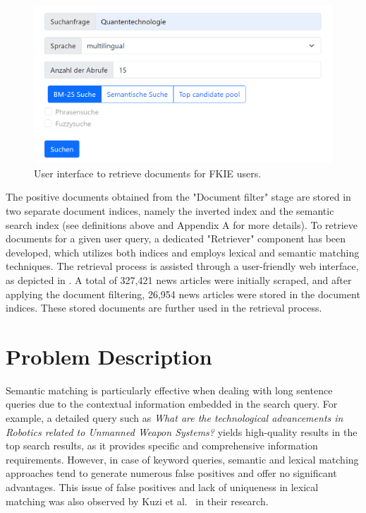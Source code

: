 \begin{figure}[h]
	\centering
	\includegraphics[width=.7\textwidth]{images/mitera_screenshots/newsfeeds_search.PNG}
	\caption[Search user interface.]{User interface to retrieve documents for FKIE users. \label{fig:mitera_search}}
\end{figure}

The positive documents obtained from the "Document filter" stage are stored in two separate document indices, namely the inverted index and the semantic search index (see definitions above and Appendix A for more details). To retrieve documents for a given user query, a dedicated "Retriever" component has been developed, which utilizes both indices and employs lexical and semantic matching techniques. The retrieval process is assisted through a user-friendly web interface, as depicted in . A total of 327,421 news articles were initially scraped, and after applying the document filtering, 26,954 news articles were stored in the document indices. These stored documents are further used in the retrieval process.


\section{Problem Description}

Semantic matching is particularly effective when dealing with long sentence queries due to the contextual information embedded in the search query. For example, a detailed query such as \textit{What are the technological advancements in Robotics related to Unmanned Weapon Systems?} yields high-quality results in the top search results, as it provides specific and comprehensive information requirements. However, in case of keyword queries, semantic and lexical matching approaches tend to generate numerous false positives and offer no significant advantages. This issue of false positives and lack of uniqueness in lexical matching was also observed by Kuzi et al.~\cite{kuzi2020leveraging} in their research.


